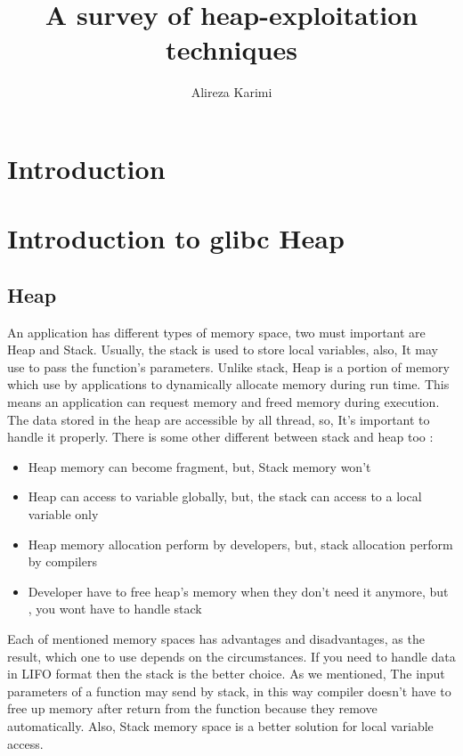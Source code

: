 \documentclass{masterthesis}
\newcommand*\libc{glibc}
\begin{document}
\title{A survey of heap-exploitation techniques}

\author{Alireza Karimi}



\maketitle

\tableofcontents

\chapter{Introduction}

\chapter{Introduction to \libc{} Heap}

\section{Heap}

An application has different types of memory space, two must important are Heap and Stack. Usually, the stack is used to store local variables, also, It may use to pass the function's parameters. Unlike stack, Heap is a portion of memory which use by applications to dynamically allocate memory during run time. This means an application can request memory and freed memory during execution. The data stored in the heap are accessible by all thread, so, It's important to handle it properly. There is some other different between stack and heap too :
\begin{itemize}
	\item Heap memory can become fragment, but, Stack memory won't
	\item Heap can access to variable globally, but, the stack can access to a local variable only
	\item Heap memory allocation perform by developers, but, stack allocation perform by compilers
	\item Developer have to free heap's memory when they don't need it anymore, but , you wont have to handle stack
\end{itemize}
Each of mentioned memory spaces has advantages and disadvantages, as the result, which one to use depends on the circumstances. If you need to handle data in LIFO format then the stack is the better choice. As we mentioned, The input parameters of a function may send by stack, in this way compiler doesn't have to free up memory after return from the function because they remove automatically. Also, Stack memory space is a better solution for local variable access.
\end{document}
